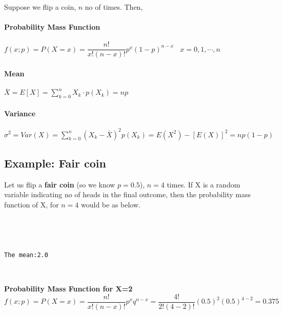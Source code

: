 \documentclass[float=false,crop=false]{standalone}
\begin{document}
Suppose we flip a coin, \(n\) no of times. Then,

\paragraph{Probability Mass Function}\label{probability-mass-function}

\(f(x;p) = P(X = x) = \dfrac {n!}{x!(n-x)!}p^{x}(1-p)^{n-x} \ \ \ \ x=0,1,\cdots,n\)

\paragraph{Mean}\label{mean}

\(\overline{X} = E[X] = \sum\limits_{k=0}^nX_k \cdot p(X_k) = np\)

\paragraph{Variance}\label{variance}

\(\sigma^2 = Var(X) = \sum\limits_{k=0}^n (X_{k}-\bar{X})^2p(X_k) = E(X^2) - [E(X)]^2 = np(1-p)\)

\subsection{Example: Fair coin}\label{example-fair-coin}

Let us flip a \textbf{fair coin} (so we know \(p = 0.5\)), \(n=4\)
times. If X is a random variable indicating no of heads in the final
outcome, then the probability mass function of X, for \(n=4\) would be
as below.
    \begin{Verbatim}[commandchars=\\\{\},fontsize=\footnotesize]




The mean:2.0

    \end{Verbatim}

    \begin{center}
    \end{center}
    { \hspace*{\fill} \\}
    
    \textbf{Probability Mass Function for X=2}\\
\(f(x;p) = P(X = x) = \dfrac {n!}{x!(n-x)!}p^{x}q^{n-x} = \dfrac{4!}{2!(4-2)!}(0.5)^{2}(0.5)^{4-2} = 0.375\)
\end{document}
